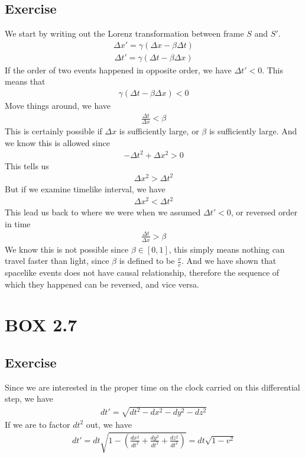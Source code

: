\documentclass[12pt]{memoir}
\newcommand{\dydx}[2]{\frac{d #1}{d #2}}
\newcommand{\sqbkt}[1]{\left[ #1 \right]}
\newcommand{\paren}[1]{\left( #1 \right)}
\begin{document}
    \subsection{Exercise}
    We start by writing out the Lorenz transformation between frame $S$ and $S'$.
    \begin{align}
    \Delta x' = \gamma\paren{\Delta x - \beta \Delta t}
    \end{align}
    \begin{align}
    \Delta t' = \gamma\paren{\Delta t - \beta \Delta x}
    \end{align}
    If the order of two events happened in opposite order, we have $\Delta t' < 0$. This means that
    \begin{align}
    \gamma\paren{\Delta t - \beta \Delta x} < 0
    \end{align}
    Move things around, we have
    \begin{align}
    \frac{\Delta t}{\Delta x} < \beta 
    \end{align}
    This is certainly possible if $\Delta x$ is sufficiently large, or $\beta$ is sufficiently large. And we know this is allowed since 
    \begin{align}
    -\Delta t^2 + \Delta x^2 > 0
    \end{align}
    This tells us
    \begin{align}
    \Delta x^2 > \Delta t^2
    \end{align}
    But if we examine timelike interval, we have
    \begin{align}
    \Delta x^2 < \Delta t^2
    \end{align}
    This lead us back to where we were when we assumed $\Delta t' < 0$, or reversed order in time
    \begin{align}
    \frac{\Delta t}{\Delta x} > \beta 
    \end{align}
    We know this is not possible since $\beta \in \sqbkt{0,1}$, this simply means nothing can travel faster than light, since $\beta$ is defined to be $\frac{v}{c}$. And we have shown that spacelike events does not have causal relationship, therefore the sequence of which they happened can be reversed, and vice versa. 

    \section{BOX 2.7}
        \subsection{Exercise}
        Since we are interested in the proper time on the clock carried on this differential step, we have
        \begin{align}
        dt' = \sqrt{dt^2 - dx^2 -dy^2 -dz^2}
        \end{align}
        If we are to factor $dt^2$ out, we have
        \begin{align}
        dt' = dt\sqrt{1- \paren{\dydx{x^2}{t^2}+\dydx{y^2}{t^2}+\dydx{z^2}{t^2}}} = dt\sqrt{1-v^2}
        \end{align}
\end{document}
